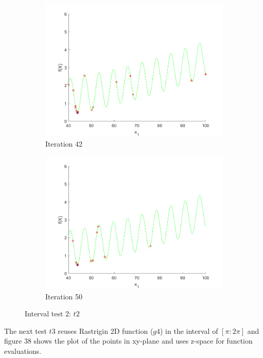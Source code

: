\begin{figure}
\begin{subfigure}[b]{0.4\textwidth}
   \includegraphics[width=\textwidth]{img/smpl/grwnk1dshft/loa-iter-42}
   \caption{Iteration 42}
   \label{fig:i2-iter-6}
 \end{subfigure}
 \begin{subfigure}[b]{0.4\textwidth}
   \includegraphics[width=\textwidth]{img/smpl/grwnk1dshft/loa-iter-50}
   \caption{Iteration 50}
   \label{fig:i2-iter-7}
 \end{subfigure}
 \caption{Interval test 2: $t2$}
\end{figure}

\par The next test $t3$ reuses Rastrigin 2D function ($g4$) in the interval of $[\pi:2\pi]$ and figure 38 shows the plot of the points in xy-plane and uses z-space for function evaluations.

